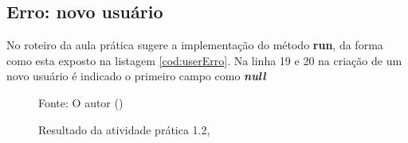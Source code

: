 \subsection{Erro: novo usuário}

\par No roteiro da aula prática sugere a implementação do método \textbf{run}, da forma como esta exposto na listagem \ref{cod:userErro}. Na linha 19 e 20 na criação de um novo usuário é indicado o primeiro campo como \textit{\textbf{null}} 

\begin{figure}[H]
  \flushleft %
    {\fontsize{10pt}{\baselineskip}\selectfont  Fonte: O autor (\the\year) }
\end{figure}







\begin{figure}[H] %
  \center
  \caption{Resultado da atividade prática 1.2, \cite{oliveira_SO2009}}\label{fig:ap1_cod_vigual1}
\end{figure}

